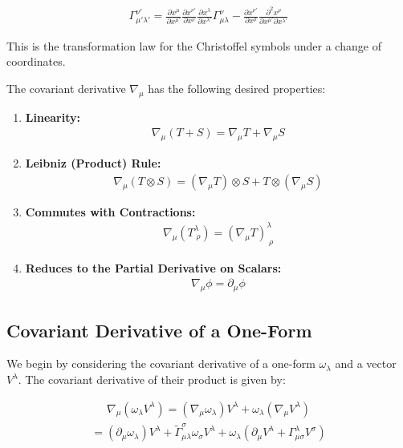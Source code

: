 \documentclass[12pt]{book}
\begin{document}
\begin{align}
\Gamma^{\nu'}_{\mu'\lambda'} = \frac{\partial x^\mu}{\partial x^{\mu'}} \frac{\partial x^{\nu'}}{\partial x^\nu} \frac{\partial x^\lambda}{\partial x^{\lambda'}} \Gamma^\nu_{\mu\lambda} - \frac{\partial x^{\nu'}}{\partial x^\rho} \frac{\partial^2 x^\rho}{\partial x^{\mu'} \partial x^{\lambda'}}
\end{align}

This is the transformation law for the Christoffel symbols under a change of coordinates.


The covariant derivative \( \nabla_\mu \) has the following desired properties:

\begin{enumerate}
    \item \textbf{Linearity:} 
    \begin{align}
    \nabla_\mu (T + S) = \nabla_\mu T + \nabla_\mu S
    \end{align}
    
    \item \textbf{Leibniz (Product) Rule:} 
    \begin{align}
    \nabla_\mu (T \otimes S) = (\nabla_\mu T) \otimes S + T \otimes (\nabla_\mu S)
    \end{align}
    
    \item \textbf{Commutes with Contractions:} 
    \begin{align}
    \nabla_\mu (T^\lambda_{\;\rho}) = (\nabla_\mu T)^\lambda_{\;\rho}
    \end{align}
    
    \item \textbf{Reduces to the Partial Derivative on Scalars:} 
    \begin{align}
    \nabla_\mu \phi = \partial_\mu \phi
    \end{align}
\end{enumerate}

\subsection{Covariant Derivative of a One-Form}

We begin by considering the covariant derivative of a one-form \( \omega_\lambda \) and a vector \( V^\lambda \). The covariant derivative of their product is given by:

\begin{align}
\nabla_\mu (\omega_\lambda V^\lambda) = (\nabla_\mu \omega_\lambda) V^\lambda + \omega_\lambda (\nabla_\mu V^\lambda)
\end{align}
\begin{align}
= (\partial_\mu \omega_\lambda) V^\lambda + \tilde{\Gamma}^\sigma_{\mu\lambda} \omega_\sigma V^\lambda + \omega_\lambda (\partial_\mu V^\lambda + \Gamma^\lambda_{\mu\sigma} V^\sigma)
\end{align}
\end{document}
